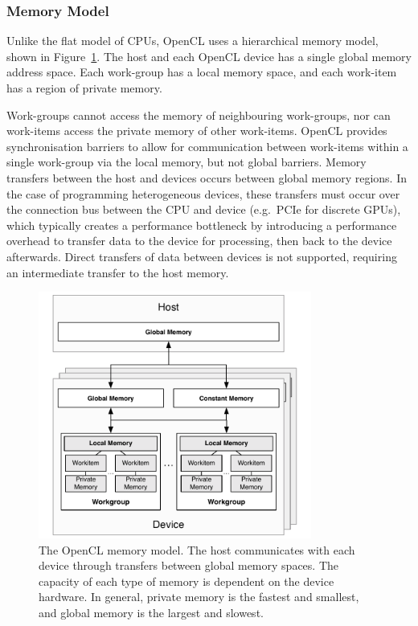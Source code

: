 \subsubsection{Memory Model}

Unlike the flat model of CPUs, OpenCL uses a hierarchical memory model, shown in Figure~\ref{fig:opencl-memory}. The host and each OpenCL device has a single global memory address space. Each work-group has a local memory space, and each work-item has a region of private memory.

Work-groups cannot access the memory of neighbouring work-groups, nor can work-items access the private memory of other work-items. OpenCL provides synchronisation barriers to allow for communication between work-items within a single work-group via the local memory, but not global barriers. Memory transfers between the host and devices occurs between global memory regions. In the case of programming heterogeneous devices, these transfers must occur over the connection bus between the CPU and device (e.g.\ PCIe for discrete GPUs), which typically creates a performance bottleneck by introducing a performance overhead to transfer data to the device for processing, then back to the device afterwards. Direct transfers of data between devices is not supported, requiring an intermediate transfer to the host memory.

\begin{figure}
	\centering
	\includegraphics[width=0.8\textwidth]{img/opencl-memory}
	\caption[The OpenCL memory model]{%
		The OpenCL memory model. The host communicates with each device through transfers between global memory spaces. The capacity of each type of memory is dependent on the device hardware. In general, private memory is the fastest and smallest, and global memory is the largest and slowest.%
	}
	\label{fig:opencl-memory}
\end{figure}


